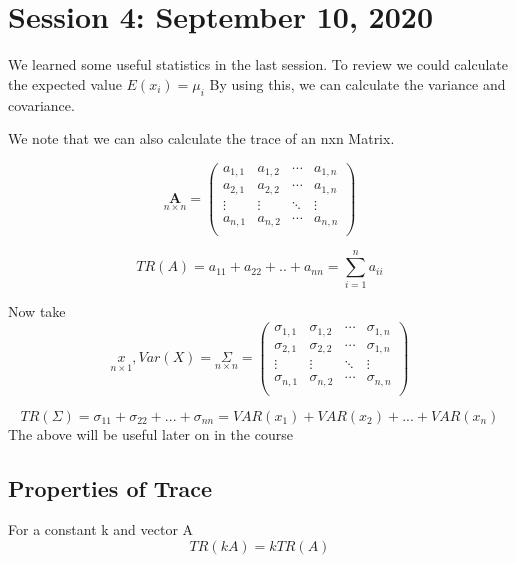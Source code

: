 \chapter{Session 4: September 10, 2020}
\label{fourth}
We learned some useful statistics in the last session. To review we could calculate
the expected value $E(x_i) = \mu_i$ By using this, we can calculate the variance and covariance.

We note that we can also calculate the trace of an nxn Matrix.

\begin{equation*}
    \underset{n \times n}{\textbf{A}} =
    \begin{pmatrix}
    a_{1,1} & a_{1,2} & \cdots & a_{1,n} \\
    a_{2,1} & a_{2,2} & \cdots & a_{1,n} \\
    \vdots & \vdots & \ddots & \vdots \\
    a_{n,1} & a_{n,2} & \cdots & a_{n,n} \\
    \end{pmatrix}
\end{equation*}

\begin{equation*}
    TR(A) = a_{11}+ a_{22}+..+a_{nn} = \displaystyle\sum_{i=1}^{n}a_{ii}
\end{equation*}


Now take 
\begin{equation*}
\underset{n \times 1}{x}, Var(X) = \underset{n \times n}{\Sigma} =
    \begin{pmatrix}
    \sigma_{1,1} & \sigma_{1,2} & \cdots & \sigma_{1,n} \\
    \sigma_{2,1} & \sigma_{2,2} & \cdots & \sigma_{1,n} \\
    \vdots & \vdots & \ddots & \vdots \\
    \sigma_{n,1} & \sigma_{n,2} & \cdots & \sigma_{n,n} \\
    \end{pmatrix}
\end{equation*}

\[TR(\Sigma) = \sigma_{11}+\sigma_{22}+...+\sigma_{nn}
= VAR(x_1)+VAR(x_2)+...+VAR(x_n)\]
The above will be useful later on in the course

\section{Properties of Trace}
For a constant k and vector A 
\[TR(kA) = k TR(A)\]

